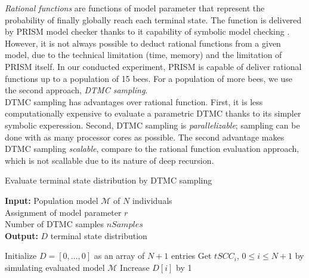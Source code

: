 \documentclass[12pt]{article}
\theoremstyle{definition}
\begin{document}
\textit{Rational functions} are functions of model parameter that represent the
probability of finally globally reach each terminal state. The function is
delivered by PRISM model checker thanks to it capability of symbolic model
checking \cite{KNP11}.\\
However, it is not always possible to deduct rational functions from a given
model, due to the technical limitation (time, memory) and the limitation of
PRISM itself. In our conducted experiment, PRISM is capable of deliver rational
functions up to a population of 15 bees. For a population of more bees, we use
the second approach, \textit{DTMC sampling}.\\
DTMC sampling has advantages over rational function. First, it is less
computationally expensive to evaluate a parametric DTMC thanks to its simpler
symbolic experession. Second, DTMC sampling is \textit{parallelizable}; sampling
can be done with as many processor cores as possible. The second advantage makes
DTMC sampling \textit{scalable}, compare to the rational function evaluation
approach, which is not scallable due to its nature of deep recursion.
\begin{algorithm}[H]
  \caption{Evaluate terminal state distribution by DTMC sampling}
  \hspace*{\algorithmicindent} \textbf{Input:} Population model $\mathcal{M}$ of
    $N$ individuals\\ Assignment of model parameter $r$\\ Number of DTMC samples $nSamples$\\
  \hspace*{\algorithmicindent} \textbf{Output:} $D$ terminal state distribution
  \begin{algorithmic}[1]
    \State Initialize $D=[0,\ldots,0]$ as an array of $N+1$ entries
    \State Get $tSCC_i$, $0\leq i \leq N+1$ by simulating evaluated
    model $\mathcal{M}$
    \State Increase $D[i]$ by 1
    \EndWhile
    \EndProcedure
  \end{algorithmic}
\end{algorithm}
\end{document}
